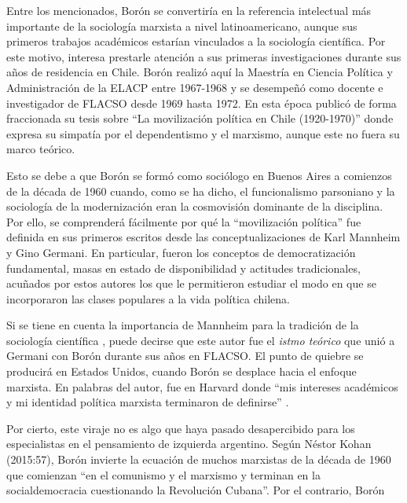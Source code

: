 Entre los mencionados, Borón se convertiría en la referencia intelectual más importante de la sociología marxista a nivel latinoamericano, aunque sus primeros trabajos académicos estarían vinculados a la sociología científica. Por este motivo, interesa prestarle atención a sus primeras investigaciones durante sus años de residencia en Chile. Borón realizó aquí la Maestría en Ciencia Política y Administración de la ELACP entre 1967-1968 y se desempeñó como docente e investigador de FLACSO desde 1969 hasta 1972. En esta época publicó de forma fraccionada su tesis sobre \enquote{La movilización política en Chile (1920-1970)} donde expresa su simpatía por el dependentismo y el marxismo, aunque este no fuera su marco teórico.

Esto se debe a que Borón se formó como sociólogo en Buenos Aires a comienzos de la década de 1960 cuando, como se ha dicho, el funcionalismo parsoniano y la sociología de la modernización eran la cosmovisión dominante de la disciplina. Por ello, se comprenderá fácilmente por qué la \enquote{movilización política} fue definida en sus primeros escritos desde las conceptualizaciones de Karl Mannheim y Gino Germani. En particular, fueron los conceptos de democratización fundamental, masas en estado de disponibilidad y actitudes tradicionales, acuñados por estos autores los que le permitieron estudiar el modo en que se incorporaron las clases populares a la vida política chilena.

Si se tiene en cuenta la importancia de Mannheim para la tradición de la sociología científica \parencite{278-AMARAL2018,1504-VILA2023,1565-BLANCO2006}, puede decirse que este autor fue el \emph{istmo teórico} que unió a Germani con Borón durante sus años en FLACSO. El punto de quiebre se producirá en Estados Unidos, cuando Borón se desplace hacia el enfoque marxista. En palabras del autor, fue en Harvard donde \enquote{mis intereses académicos y mi identidad política marxista terminaron de definirse} \parencite[69]{1568-BORON2020}.

Por cierto, este viraje no es algo que haya pasado desapercibido para los especialistas en el pensamiento de izquierda argentino. Según Néstor Kohan (2015:57), Borón invierte la ecuación de muchos marxistas de la década de 1960 que comienzan \enquote{en el comunismo y el marxismo y terminan en la socialdemocracia cuestionando la Revolución Cubana}. Por el contrario, Borón

